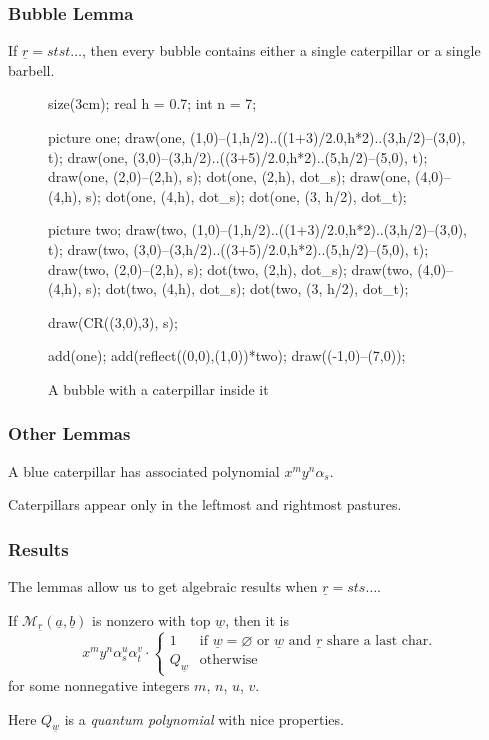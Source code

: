 \documentclass[pdf]{beamer}
\def\ul#1{\underline{#1}}
\def\MM{\mathcal M}
\begin{document}
\begin{frame}[fragile]
	\frametitle{Bubble Lemma}
	\begin{lemma}
		If $\ul r = stst\dots$, then
		every bubble contains either a single caterpillar or a single barbell.
	\end{lemma}
	\begin{figure}[ht]
		\centering
		\begin{asy}
		size(3cm);
		real h = 0.7;
		int n = 7;

		picture one;
		draw(one, (1,0)--(1,h/2)..((1+3)/2.0,h*2)..(3,h/2)--(3,0), t);
		draw(one, (3,0)--(3,h/2)..((3+5)/2.0,h*2)..(5,h/2)--(5,0), t);
		draw(one, (2,0)--(2,h), s);
		dot(one, (2,h), dot_s);
		draw(one, (4,0)--(4,h), s);
		dot(one, (4,h), dot_s);
		dot(one, (3, h/2), dot_t);

		picture two;
		draw(two, (1,0)--(1,h/2)..((1+3)/2.0,h*2)..(3,h/2)--(3,0), t);
		draw(two, (3,0)--(3,h/2)..((3+5)/2.0,h*2)..(5,h/2)--(5,0), t);
		draw(two, (2,0)--(2,h), s);
		dot(two, (2,h), dot_s);
		draw(two, (4,0)--(4,h), s);
		dot(two, (4,h), dot_s);
		dot(two, (3, h/2), dot_t);

		draw(CR((3,0),3), s);

		add(one); add(reflect((0,0),(1,0))*two);
		draw((-1,0)--(7,0));
		\end{asy}
		\caption{A bubble with a caterpillar inside it}
	\end{figure}
\end{frame}

\begin{frame}
	\frametitle{Other Lemmas}
	\begin{lemma}
		A blue caterpillar has associated polynomial $x^my^n\alpha_s$.
	\end{lemma}
	\pause
	\begin{lemma}
		Caterpillars appear only in the leftmost and rightmost pastures.
	\end{lemma}
\end{frame}

\begin{frame}
	\frametitle{Results}
	The lemmas allow us to get algebraic results when $\ul r = sts\dots$.
	\begin{theorem}
		If $\MM_{\ul r} (\ul a, \ul b)$ is nonzero with top $\ul w$, then it is
		\[
			x^{m}y^{n}\alpha_s^{u}\alpha_t^{v} \cdot
			\begin{cases}
				1 & \text{if $\ul w = \varnothing$ or $\ul w$ and $\ul r$ share a last char.} \\ 
				Q_{\ul w}  & \text{otherwise}
			\end{cases}
		\]
		for some nonnegative integers $m$, $n$, $u$, $v$.
		\label{thm:alt_struct}
	\end{theorem}
	Here $Q_{\ul w}$ is a \emph{quantum polynomial} with nice properties.
\end{frame}
\end{document}
